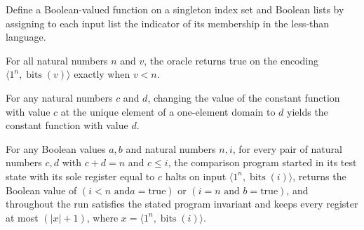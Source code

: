 \begin{definition}
\label{BoolCircuit.AdjExample.orc}
\leanok
{}
Define a Boolean-valued function on a singleton index set and Boolean lists by assigning
to each input list the indicator of its membership in the less-than language.
\end{definition}

\begin{lemma}
\label{BoolCircuit.AdjExample.orc_eq}
\leanok
{}
For all natural numbers $n$ and $v$, the oracle returns true on the encoding $\langle
1^n,\operatorname{bits}(v)\rangle$ exactly when $v<n$.
\end{lemma}

\begin{lemma}
\label{BoolCircuit.AdjExample.upd_const}
\leanok
{}
For any natural numbers $c$ and $d$, changing the value of the constant function with
value $c$ at the unique element of a one-element domain to $d$ yields the constant
function with value $d$.
\end{lemma}

\begin{lemma}
\label{BoolCircuit.AdjExample.loop}
\leanok
{}
For any Boolean values $a,b$ and natural numbers $n,i$, for every pair of natural
numbers $c,d$ with $c+d=n$ and $c\le i$, the comparison program started in its test
state with its sole register equal to $c$ halts on input $\langle
1^n,\operatorname{bits}(i)\rangle$, returns the Boolean value of $(i<n\text{ and
}a=\mathrm{true})$ or $(i=n\text{ and }b=\mathrm{true})$, and throughout the run
satisfies the stated program invariant and keeps every register at most $(|x|+1)$, where
$x=\langle 1^n,\operatorname{bits}(i)\rangle$.
\end{lemma}

